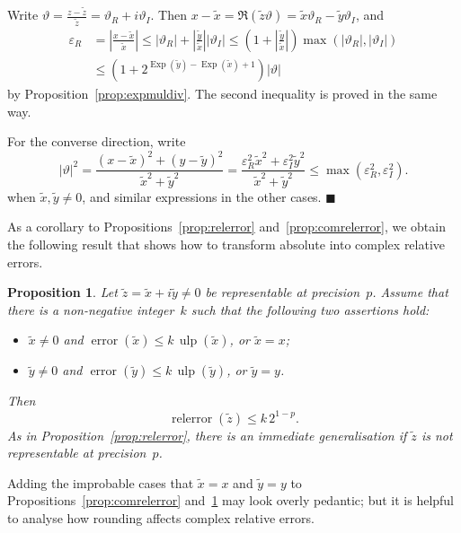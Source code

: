 \documentclass [11pt]{article}
\newcommand {\corr}[1]{{#1}}
\newcommand {\appro}[1]{\widetilde {#1}}
\newcommand {\Ulp}{{\operatorname {ulp}}}
\DeclareMathOperator{\Exp}{\operatorname {Exp}}
\newcommand{\error}{\operatorname {error}}
\newcommand{\relerror}{\operatorname {relerror}}
\renewcommand {\epsilon}{\varepsilon}
\renewcommand {\theta}{\vartheta}
\renewcommand {\leq}{\leqslant}
\newtheorem{prop}[theorem]{Proposition}
\newenvironment{proof}{\noindent{\bf Proof:}}{{\hspace* {\fill}$\blacksquare$}}
\begin{document}
\begin {proof}
Write $\theta = \frac {\corr z - \appro z}{\appro z}
= \theta_R + i \theta_I$. Then
$\corr x - \appro x = \Re (\appro z \theta)
= \appro x \theta_R - \appro y \theta_I$, and
\begin {align*}
\epsilon_R
&= \left| \frac {\corr x - \appro x}{\appro x} \right|
\leq |\theta_R| + \left| \frac {\appro y}{\appro x} \right| |\theta_I|
\leq \left( 1 + \left| \frac {\appro y}{\appro x} \right| \right)
\max (|\theta_R|, |\theta_I|) \\
&\leq \left( 1 + 2^{\Exp (\appro y) - \Exp (\appro x) + 1} \right)
|\theta|
\end {align*}
by Proposition~\ref {prop:expmuldiv}. The second inequality is proved
in the same way.

For the converse direction, write
\[
|\theta|^2
= \frac {(\corr x - \appro x)^2 + (\corr y - \appro y)^2}{\appro x^2 + \appro y^2}
= \frac {\epsilon_R^2 \appro x^2 + \epsilon_I^2 \appro y^2}{\appro x^2 + \appro y^2}
\leq \max \left( \epsilon_R^2, \epsilon_I^2 \right).
\]
when $\appro x, \appro y \neq 0$, and similar expressions in the
other cases.
\end {proof}

As a corollary to Propositions~\ref {prop:relerror}
and~\ref {prop:comrelerror}, we obtain the following result that shows how
to transform absolute into complex relative errors.

\begin {prop}
\label {prop:comabstorelerror}
Let $\appro z = \appro x + i \appro y \neq 0$ be representable
at precision~$p$.
Assume that there is a non-negative integer~$k$ such that the following
two assertions hold:
\begin {itemize}
\item
$\appro x \neq 0$ and $\error (\appro x) \leq k \, \Ulp (\appro x)$,
or $\appro x = \corr x$;
\item
$\appro y \neq 0$ and $\error (\appro y) \leq k \, \Ulp (\appro y)$,
or $\appro y = \corr y$.
\end {itemize}
Then
\[
\relerror (\appro z) \leq k \, 2^{1-p}.
\]
As in Proposition~\ref {prop:relerror}, there is an immediate generalisation
if $\appro z$ is not representable at precision~$p$.
\end {prop}

Adding the improbable cases that $\appro x = \corr x$ and
$\appro y = \corr y$ to Propositions~\ref {prop:comrelerror}
and~\ref {prop:comabstorelerror} may look overly pedantic; but it is
helpful to analyse how rounding affects complex relative errors.
\end{document}
